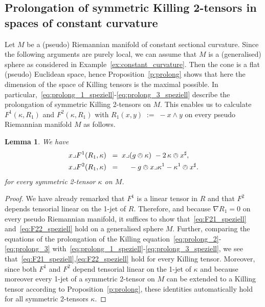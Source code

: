 \documentclass[11pt,a4paper]{article}
\theoremstyle{plain}
\newtheorem{lemma}{Lemma}
\theoremstyle{remark}
\begin{document}
\subsection{Prolongation  of symmetric Killing 2-tensors in spaces of constant
curvature}
Let $M$ be a (pseudo) Riemannian manifold of constant sectional
curvature. Since the following arguments are purely local, we can assume that
$M$ is a (generalised) sphere as considered in
Example~\ref{ex:constant_curvature}. Then the cone is a flat (pseudo)
Euclidean space, hence Proposition~\ref{p:prolong} shows that here the
dimension of the space of Killing tensors is the maximal possible. In particular,~\eqref{eq:prolong_1_speziell}-\eqref{eq:prolong_3_speziell} describe
the prolongation of symmetric Killing 2-tensors on $M$. This enables us
to calculate $F^1(\kappa,R_1)$ and $F^2(\kappa,R_1)$ with $R_1(x,y)\;:=\;-
x\wedge y$ on every pseudo Riemannian manifold $M$ as follows.

\bigskip
\begin{lemma}\label{le:curvature_terms_for_S1}
We have
\begin{align}\label{eq:F21_speziell}
 x\lrcorner F^1(R_1,\kappa)\;\;=\;\;& x\lrcorner (g\owedge \kappa) \ - 2\, \kappa\owedge x^\sharp ,\\
\label{eq:F22_speziell}
 x\lrcorner F^2(R_1,\kappa)\;\;=\;\;& \ \ \ -  g\owedge x\lrcorner \kappa^1  - \kappa^1 \owedge x^\sharp .
 \end{align}
for every symmetric 2-tensor $\kappa$ on $M$.
\end{lemma}
\begin{proof}
We have already remarked that $F^1$ is a linear tensor in $R$ and that $F^2$ depends
tensorial linear on the 1-jet of $R$. Therefore, and because $\nabla R_1 = 0$ on every
pseudo Riemannian manifold, it suffices to show that~\eqref{eq:F21_speziell} and~\eqref{eq:F22_speziell} hold on a generalised sphere $M$. Further, comparing the equations of the prolongation of the
Killing equation~\eqref{eq:prolong_2}-\eqref{eq:prolong_3} with~\eqref{eq:prolong_1_speziell}-\eqref{eq:prolong_3_speziell},
we see that~\eqref{eq:F21_speziell},\eqref{eq:F22_speziell} hold for every Killing tensor. Moreover, since both $F^1$ and $F^2$
depend tensorial linear on the 1-jet of $\kappa$ and because moreover every 1-jet of a symmetric 2-tensor on $M$ can be extended 
to a Killing tensor according to Proposition~\ref{p:prolong}, these identities
automatically hold for all symmetric 2-tensors $\kappa$.
\end{proof}
\end{document}
